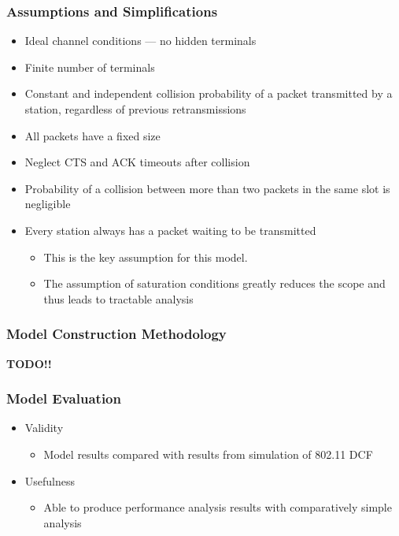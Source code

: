\subsubsection{Assumptions and Simplifications}\label{subsubsec:Bianchi_Model_Assumptions}
\begin{itemize}[noitemsep]
\item Ideal channel conditions — no hidden terminals
\item Finite number of terminals
\item Constant and independent collision probability of a packet transmitted by a station, regardless of previous retransmissions
\item All packets have a fixed size
\item Neglect CTS and ACK timeouts after collision
\item Probability of a collision between more than two packets in the same slot is negligible
\item Every station always has a packet waiting to be transmitted
  \begin{itemize}[noitemsep]
  \item This is the key assumption for this model.
  \item The assumption of saturation conditions greatly reduces the
    scope and thus leads to tractable analysis
  \end{itemize}
\end{itemize}

\subsubsection{Model Construction Methodology}\label{subsubsec:Bianchi_Model_Method}
\textbf{TODO!!}

\subsubsection{Model Evaluation}\label{subsubsec:Bianchi_Model_Eval}
\begin{itemize}[noitemsep]
\item Validity
  \begin{itemize}[noitemsep]
  \item Model results compared with results from simulation of 802.11 DCF
  \end{itemize}

\item Usefulness
  \begin{itemize}[noitemsep]
  \item Able to produce performance analysis results with comparatively simple analysis
  \end{itemize}
\end{itemize}

